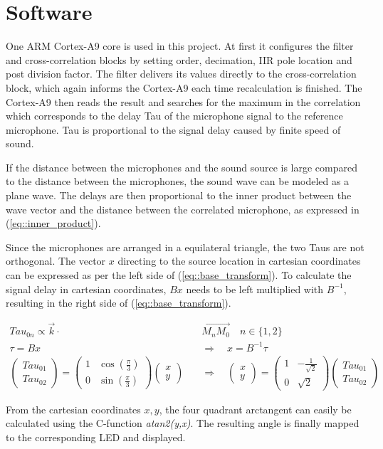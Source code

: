 \section{Software}
\label{sec::software}

One ARM Cortex-A9 core is used in this project.
At first it configures the filter and cross-correlation blocks by setting order, decimation, IIR pole location and post division factor.
The filter delivers its values directly to the cross-correlation block, which again informs the Cortex-A9 each time recalculation is finished.
The Cortex-A9 then reads the result and searches for the maximum in the correlation which corresponds to the delay Tau of the microphone signal to the reference microphone. Tau is proportional to the signal delay caused by finite speed of sound.

If the distance between the microphones and the sound source is large compared to the distance between the microphones, the sound wave can be modeled as a plane wave.
The delays are then proportional to the inner product between the wave vector and the  distance between the correlated microphone, as expressed in (\ref{eq::inner_product}).

Since the microphones are arranged in a equilateral triangle, the two Taus are not orthogonal.
The vector $x$ directing to the source location in cartesian coordinates can be expressed as per the left side of (\ref{eq::base_transform}).
To calculate the signal delay in cartesian coordinates, $Bx$ needs to be left multiplied with $B^{-1}$, resulting in the right side of  (\ref{eq::base_transform}).

\begin{align}
	{Tau}_{0n} \propto \overrightarrow{k} \cdot &\overrightarrow{M_nM_0} \quad n\in\{1,2\}\label{eq::inner_product} \\
	\tau = Bx \quad &\Rightarrow \quad x = B^{-1}\tau \label{eq::base_transform}\\
	\begin{pmatrix} {Tau}_{01} \\ {Tau}_{02}\end{pmatrix}
		=  \begin{pmatrix} 1 & \cos(\frac{\pi}{3}) \\ 0 & \sin(\frac{\pi}{3})\end{pmatrix} \begin{pmatrix} x \\ y\end{pmatrix}
	\quad &\Rightarrow \quad \begin{pmatrix} x \\ y \end{pmatrix}	= \begin{pmatrix} 1 & -\frac{1}{\sqrt{2}} \\ 0 & \sqrt{2}\end{pmatrix} \begin{pmatrix} {Tau}_{01} \\ {Tau}_{02}\end{pmatrix}
\end{align}

From the cartesian coordinates $x,y$, the four quadrant arctangent can easily be calculated using the C-function \emph{atan2(y,x)}.
The resulting angle is finally mapped to the corresponding LED and displayed.